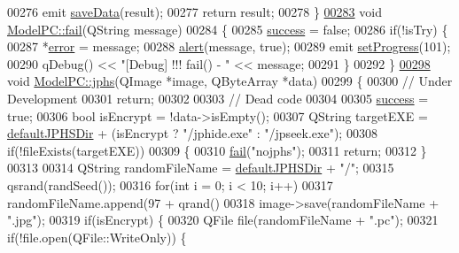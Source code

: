 \begin{DoxyCode}
00276         emit \hyperlink{class_model_p_c_a0855107fb0ccc247cd9e893fae9bb08a}{saveData}(result);
00277     \textcolor{keywordflow}{return} result;
00278 \}
\hypertarget{modelpc_8cpp_source.tex_l00283}{}\hyperlink{class_model_p_c_a47464b59b7e37fcee25e55475708aabd}{00283} \textcolor{keywordtype}{void} \hyperlink{class_model_p_c_a47464b59b7e37fcee25e55475708aabd}{ModelPC::fail}(QString message)
00284 \{
00285     \hyperlink{class_model_p_c_a945ffbbc44a832b953c191debd448f4c}{success} = \textcolor{keyword}{false};
00286     \textcolor{keywordflow}{if}(!isTry) \{
00287         *\hyperlink{class_model_p_c_a4e5a9c0ca1f06fe5bc478b6bf248c37c}{error} = message;
00288         \hyperlink{class_model_p_c_a9079a101d83672aa48fd2dbac797de40}{alert}(message, \textcolor{keyword}{true});
00289         emit \hyperlink{class_model_p_c_afdcd80f0ed5062e145a71f09b0897547}{setProgress}(101);
00290         qDebug() << \textcolor{stringliteral}{"[Debug] !!! fail() - "} << message;
00291     \}
00292 \}
\hypertarget{modelpc_8cpp_source.tex_l00298}{}\hyperlink{class_model_p_c_a8bee0255c09449868c7e6097afaaf0cd}{00298} \textcolor{keywordtype}{void} \hyperlink{class_model_p_c_a8bee0255c09449868c7e6097afaaf0cd}{ModelPC::jphs}(QImage *image, QByteArray *data)
00299 \{
00300     \textcolor{comment}{// Under Development}
00301     \textcolor{keywordflow}{return};
00302 
00303     \textcolor{comment}{// Dead code}
00304 
00305     \hyperlink{class_model_p_c_a945ffbbc44a832b953c191debd448f4c}{success} = \textcolor{keyword}{true};
00306     \textcolor{keywordtype}{bool} isEncrypt = !data->isEmpty();
00307     QString targetEXE = \hyperlink{class_model_p_c_abd038306f14f22fb885a1697c96d6335}{defaultJPHSDir} + (isEncrypt ? \textcolor{stringliteral}{"/jphide.exe"} : \textcolor{stringliteral}{"/jpseek.exe"});
00308     \textcolor{keywordflow}{if}(!fileExists(targetEXE))
00309     \{
00310         \hyperlink{class_model_p_c_a47464b59b7e37fcee25e55475708aabd}{fail}(\textcolor{stringliteral}{"nojphs"});
00311         \textcolor{keywordflow}{return};
00312     \}
00313 
00314     QString randomFileName = \hyperlink{class_model_p_c_abd038306f14f22fb885a1697c96d6335}{defaultJPHSDir} + \textcolor{stringliteral}{"/"};
00315     qsrand(randSeed());
00316     \textcolor{keywordflow}{for}(\textcolor{keywordtype}{int} i = 0; i < 10; i++)
00317         randomFileName.append(97 + qrand() %
00318     image->save(randomFileName + \textcolor{stringliteral}{".jpg"});
00319     \textcolor{keywordflow}{if}(isEncrypt) \{
00320         QFile file(randomFileName + \textcolor{stringliteral}{".pc"});
00321         \textcolor{keywordflow}{if}(!file.open(QFile::WriteOnly)) \{

\end{DoxyCode}
